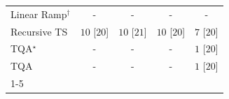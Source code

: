 \begin{tabular}{l|cccc|}
Linear Ramp$^\dagger$ & {\cellcolor[HTML]{000000}} \color[HTML]{F1F1F1} {\cellcolor{white}} \color{black} - & {\cellcolor[HTML]{000000}} \color[HTML]{F1F1F1} {\cellcolor{white}} \color{black} - & {\cellcolor[HTML]{000000}} \color[HTML]{F1F1F1} {\cellcolor{white}} \color{black} - & {\cellcolor[HTML]{000000}} \color[HTML]{F1F1F1} {\cellcolor{white}} \color{black} - \\
Recursive TS & {\cellcolor[HTML]{00441B}} \color[HTML]{F1F1F1} $10$ [$20$] & {\cellcolor[HTML]{00441B}} \color[HTML]{F1F1F1} $10$ [$21$] & {\cellcolor[HTML]{00441B}} \color[HTML]{F1F1F1} $10$ [$20$] & {\cellcolor[HTML]{37A055}} \color[HTML]{F1F1F1} $7$ [$20$] \\
TQA$^\star$ & {\cellcolor[HTML]{000000}} \color[HTML]{F1F1F1} {\cellcolor{white}} \color{black} - & {\cellcolor[HTML]{000000}} \color[HTML]{F1F1F1} {\cellcolor{white}} \color{black} - & {\cellcolor[HTML]{000000}} \color[HTML]{F1F1F1} {\cellcolor{white}} \color{black} - & {\cellcolor[HTML]{F7FCF5}} \color[HTML]{000000} $1$ [$20$] \\
TQA & {\cellcolor[HTML]{000000}} \color[HTML]{F1F1F1} {\cellcolor{white}} \color{black} - & {\cellcolor[HTML]{000000}} \color[HTML]{F1F1F1} {\cellcolor{white}} \color{black} - & {\cellcolor[HTML]{000000}} \color[HTML]{F1F1F1} {\cellcolor{white}} \color{black} - & {\cellcolor[HTML]{F7FCF5}} \color[HTML]{000000} $1$ [$20$] \\
\cline{1-5}
\bottomrule
\end{tabular}

